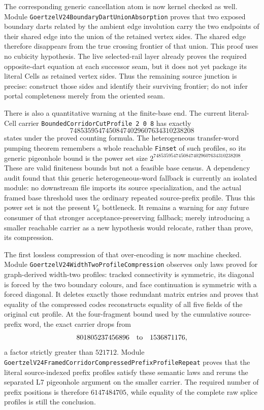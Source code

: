 \documentclass[11pt]{article}
\theoremstyle{definition}
\begin{document}
The corresponding generic cancellation atom is now kernel checked as well.
Module
\texttt{GoertzelV24BoundaryDartUnionAbsorption} proves that two exposed
boundary darts related by the ambient edge involution carry the two endpoints
of their shared edge into the union of the retained vertex sides.  The shared
edge therefore disappears from the true crossing frontier of that union.
This proof uses no cubicity hypothesis.  The live selected-rail layer already
proves the required opposite-dart equation at each successor seam, but it does
not yet package its literal Cells as retained vertex sides.  Thus the remaining
source junction is precise: construct those sides and identify their surviving
frontier; do not infer portal completeness merely from the oriented seam.

There is also a quantitative warning at the finite-base end.  The current
literal-Cell carrier
\texttt{BoundedCorridorCutProfile 2 0 8} has exactly
\[
  74853595474508474029607634310238208
\]
states under the proved counting formula.  The heterogeneous transfer-word
pumping theorem remembers a whole reachable \texttt{Finset} of such profiles,
so its generic pigeonhole bound is the power set size
\(2^{74853595474508474029607634310238208}\).  These are valid finiteness
bounds but not a feasible base census.  A dependency audit found that this
generic heterogeneous-word fallback is currently an isolated module: no
downstream file imports its source specialization, and the actual framed base
threshold uses the ordinary repeated source-prefix profile.  Thus this power
set is not the present $V_0$ bottleneck.  It remains a warning for any future
consumer of that stronger acceptance-preserving fallback; merely introducing
a smaller reachable carrier as a new hypothesis would relocate, rather than
prove, its compression.

The first lossless compression of that over-encoding is now machine checked.
Module \texttt{GoertzelV24WidthTwoProfileCompression} observes only laws proved
for graph-derived width-two profiles: tracked connectivity is symmetric, its
diagonal is forced by the two boundary colours, and face continuation is
symmetric with a forced diagonal.  It deletes exactly those redundant matrix
entries and proves that equality of the compressed codes reconstructs equality
of all five fields of the original cut profile.  At the four-fragment bound
used by the cumulative source-prefix word, the exact carrier drops from
\[
  801805237456896
  \quad\hbox{to}\quad
  1536871176,
\]
a factor strictly greater than $521712$.  Module
\texttt{GoertzelV24FramedCorridorCompressedPrefixProfileRepeat} proves that
the literal source-indexed prefix profiles satisfy these semantic laws and
reruns the separated L7 pigeonhole argument on the smaller carrier.  The
required number of prefix positions is therefore $6147484705$, while equality
of the complete raw splice profiles is still the conclusion.
\end{document}
